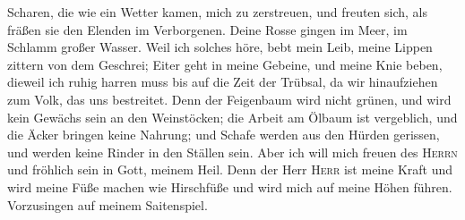Scharen, die wie ein Wetter kamen, mich zu zerstreuen, und freuten sich,
als fräßen sie den Elenden im Verborgenen.  Deine Rosse
gingen im Meer, im Schlamm großer Wasser.  Weil ich
solches höre, bebt mein Leib, meine Lippen zittern von dem Geschrei;
Eiter geht in meine Gebeine, und meine Knie beben, dieweil ich ruhig
harren muss bis auf die Zeit der Trübsal, da wir hinaufziehen zum Volk,
das uns bestreitet.  Denn der Feigenbaum wird nicht
grünen, und wird kein Gewächs sein an den Weinstöcken; die Arbeit am
Ölbaum ist vergeblich, und die Äcker bringen keine Nahrung; und Schafe
werden aus den Hürden gerissen, und werden keine Rinder in den Ställen
sein.  Aber ich will mich freuen des \textsc{Herrn} und
fröhlich sein in Gott, meinem Heil.  Denn der Herr
\textsc{Herr} ist meine Kraft und wird meine Füße machen wie Hirschfüße
und wird mich auf meine Höhen führen. Vorzusingen auf meinem
Saitenspiel.
